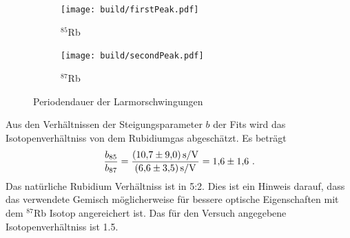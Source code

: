 \begin{figure}[h]
	\centering
	\begin{subfigure}[c]{0.45\textwidth}
	\begin{center}
		\texttt{[image: build/firstPeak.pdf]}
	\end{center}
	\caption{$^{85}$Rb}
	\label{fig:}
	\end{subfigure}
	\begin{subfigure}[c]{0.45\textwidth}
	\begin{center}
	\texttt{[image: build/secondPeak.pdf]}
	\end{center}
	\caption{$^{87}$Rb}
	\label{fig:}
	\end{subfigure}
	\caption{Periodendauer der Larmorschwingungen}
	\label{fig:fitexp}
\end{figure}
Aus den Verhältnissen der Steigungsparameter $b$ der Fits wird das
Isotopenverhältniss von dem Rubidiumgas abgeschätzt. 
Es beträgt
\begin{equation}
	\frac{b_{85}}{b_{87}} =
	\frac{\SI{10.7+-9.0}{\second\per\volt}}{\SI{6.6+-3.5}{\second\per\volt}} =
	\num{1.6 +- 1.6} \ .
\end{equation}
Das natürliche Rubidium Verhältniss ist in 5:2.
Dies ist ein Hinweis darauf, dass das verwendete Gemisch möglicherweise für
bessere optische Eigenschaften mit dem $^{87}$Rb Isotop angereichert ist. 
Das für den Versuch angegebene Isotopenverhältniss ist \num{1.5}.
